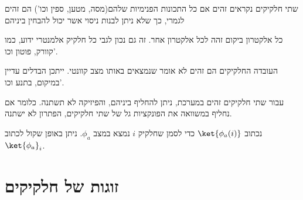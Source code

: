 \documentclass{tstextbook}
\begin{document}
\begin{definition}
שתי חלקיקים נקראים זהים אם כל התכונות הפנימיות שלהם(מסה, מטען, ספין וכו') הם זהים לגמרי, כך שלא ניתן לבנות ניסוי אשר יכול להבחין ביניהם

\end{definition}
\begin{example}
כל אלקטרון ביקום זהה לכל אלקטרון אחר. זה גם נכון לגבי כל חלקיק אלמנטרי ידוע, כמו קוורק, פוטון וכו'.

\end{example}
\begin{remark}
העובדה החלקיקים הם זהים לא אומר שנמצאים באותו מצב קוונטי. ייתכן הבדלים עדיין במיקום, בתנע וכו'.

\end{remark}
\begin{proposition}
עבור שתי חלקיקים זהים במערכת, ניתן להחליף ביניהם, והפיזיקה לא תשתנה. כלומר אם נחליף במשוואה את הפונקציות גל של שתי חלקיקים, הפתרון לא ישתנה.

\end{proposition}
\begin{symbolize}
נכתוב \(\ket{\phi_{a}(i)}\) כדי לסמן שחלקיק \(i\) נמצא במצב \(\phi_{a}\). ניתן באופן שקול לכתוב \(\ket{\phi_{a}}_{i}\).

\end{symbolize}
\section{זוגות של חלקיקים}
\end{document}
